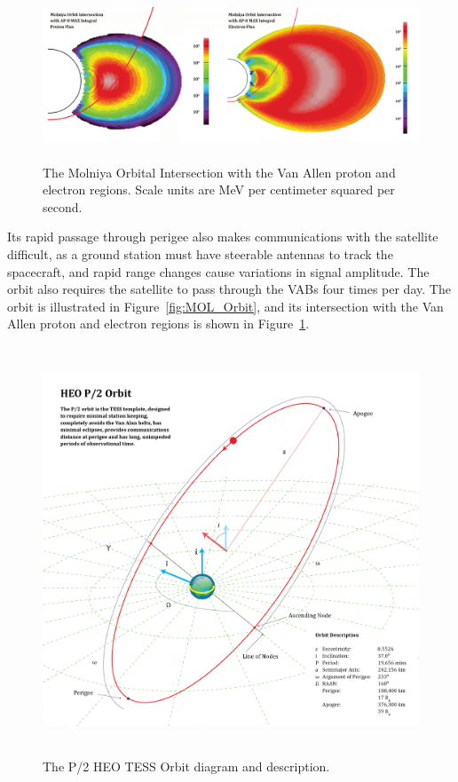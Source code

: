 \documentclass[11pt]{article}
\begin{document}
\begin{figure}[H]
    \centering
    \includegraphics[height=2in]{assets/Molniya_Flux.png}
    \caption{The Molniya Orbital Intersection with the Van Allen proton and electron regions. Scale units are MeV per centimeter squared per second.}
    \label{fig:MOLVAB}
\end{figure}

Its rapid passage through perigee also makes communications with the satellite difficult, as a ground station must have steerable antennas to track the spacecraft, and rapid range changes cause variations in signal amplitude. The orbit also requires the satellite to pass through the VABs four times per day. The orbit is illustrated in Figure~\ref{fig:MOL_Orbit}, and its intersection with the Van Allen proton and electron regions is shown in Figure~\ref{fig:MOLVAB}. 

\begin{figure}[H]
    \centering
    \includegraphics[height=4.8in]{TESS_Diagram.png}
    \caption{The P/2 HEO TESS Orbit diagram and description.}
    \label{fig:TESS_Orbit}
\end{figure}
\end{document}
